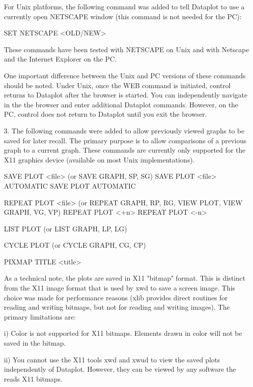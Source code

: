 {    For Unix platforms, the following command was added to tell
    Dataplot to use a currently open NETSCAPE window (this command
    is not needed for the PC):

       SET NETSCAPE <OLD/NEW>

    These commands have been tested with NETSCAPE on Unix and
    with Netscape and the Internet Explorer on the PC.

    One important difference between the Unix and PC versions of
    these commands should be noted.  Under Unix, once the WEB command
    is initiated, control returns to Dataplot after the browser is
    started.  You can independently navigate in the the browser and
    enter additional Dataplot commands.  However, on the PC, control
    does not return to Dataplot until you exit the browser.

 3. The following commands were added to allow previously viewed
    graphs to be saved for later recall.  The primary purpose is
    to allow comparisons of a previous graph to a current graph.
    These commands are currently only supported for the X11 graphics
    device (available on most Unix implementations).

       SAVE PLOT <file>    (or SAVE GRAPH, SP, SG)
       SAVE PLOT <file> AUTOMATIC
       SAVE PLOT AUTOMATIC

       REPEAT PLOT <file>  (or REPEAT GRAPH, RP, RG, VIEW PLOT,
                           VIEW GRAPH, VG, VP)
       REPEAT PLOT <+n>
       REPEAT PLOT <-n>

       LIST PLOT (or LIST GRAPH, LP, LG)

       CYCLE PLOT (or CYCLE GRAPH, CG, CP)

       PIXMAP TITLE <title>

    As a technical note, the plots are saved in X11 "bitmap" format.
    This is distinct from the X11 image format that is used by
    xwd to save a screen image.  This choice was made for performance
    reasons (xlib provides direct routines for reading and writing
    bitmaps, but not for reading and writing images).  The primary
    limitations are:

      i) Color is not supported for X11 bitmaps.  Elements drawn
         in color will not be saved in the bitmap.

     ii) You cannot use the X11 tools xwd and xwud to view the
         saved plots independently of Dataplot.  However, they
         can be viewed by any software the reads X11 bitmaps.

}
